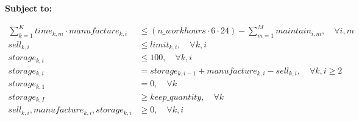 \documentclass{article}
\begin{document}
\textbf{Subject to:}

\begin{align*}
    \sum_{k=1}^{K} time_{k,m} \cdot manufacture_{k,i} & \leq (n\_workhours \cdot 6 \cdot 24) - \sum_{m=1}^{M} maintain_{i,m}, \quad \forall i, m\\
    sell_{k,i} & \leq limit_{k,i}, \quad \forall k, i\\
    storage_{k,i} & \leq 100, \quad \forall k, i\\
    storage_{k,i} & = storage_{k,i-1} + manufacture_{k,i} - sell_{k,i}, \quad \forall k, i \geq 2\\
    storage_{k,1} & = 0, \quad \forall k\\
    storage_{k,I} & \geq keep\_quantity, \quad \forall k\\
    sell_{k,i}, manufacture_{k,i}, storage_{k,i} & \geq 0, \quad \forall k, i
\end{align*}
\end{document}
